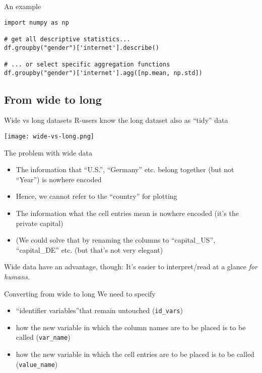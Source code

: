 \begin{frame}[fragile]{An example}
\begin{verbatim}
import numpy as np

# get all descriptive statistics...
df.groupby("gender")['internet'].describe()

# ... or select specific aggregation functions
df.groupby("gender")['internet'].agg([np.mean, np.std])
\end{verbatim}
\end{frame}


\subsection{From wide to long}

\begin{frame}{Wide vs long datasets}
R-users know the long dataset also as ``tidy'' data

\centering

\texttt{[image: wide-vs-long.png]}\hfill


\end{frame}

\begin{frame}{The problem with wide data}

  \begin{itemize}[<+->]
  \item The information that ``U.S.'', ``Germany'' etc. belong together (but not ``Year'') is nowhere encoded
  \item Hence, we cannot refer to the ``country'' for plotting
  \item The information what the cell entries mean is nowhere encoded (it's the private capital)
  \item (We could solve that by renaming the columns to ``capital\_US'', ``capital\_DE'' etc. (but that's not very elegant)
  \end{itemize}

  \pause

  Wide data have an advantage, though: It's easier to interpret/read at a glance \emph{for humans}. 

\end{frame}

\begin{frame}[fragile]{Converting from wide to long}
  We need to specify
  \begin{itemize}
  \item ``identifier variables''that remain untouched (\texttt{id\_vars})
  \item how the new variable in which the column names are to be placed is to be called (\texttt{var\_name})
  \item how the new variable in which the cell entries are to be placed is to be called (\texttt{value\_name})
  \end{itemize}
\end{frame}

